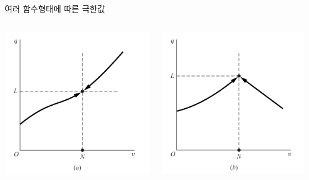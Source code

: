 \documentclass[aspectratio=169]{beamer}
\begin{document}
\begin{frame}{여러 함수형태에 따른 극한값}
  \begin{columns}
    \begin{column}{0.5\textwidth}
      \centering
      \includegraphics[width=\linewidth,height=0.48\textheight,keepaspectratio]{../fig/limits_illustration_a.png}
    \end{column}
    \begin{column}{0.5\textwidth}
      \centering
      \includegraphics[width=\linewidth,height=0.48\textheight,keepaspectratio]{../fig/limits_illustration_b.png}
    \end{column}
  \end{columns}


\end{frame}
\end{document}

